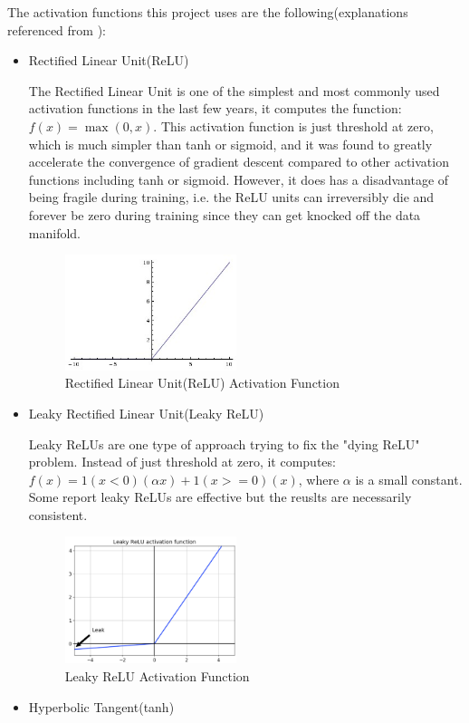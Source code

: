 The activation functions this project uses are the following(explanations referenced from \cite{cs231n}):
\begin{itemize}
    \item Rectified Linear Unit(ReLU)
    
    The Rectified Linear Unit is one of the simplest and most commonly used activation functions 
    in the last few years, it computes the function: $f(x)=\max(0,x)$. 
    This activation function is just threshold at zero, which is much simpler than tanh or sigmoid, 
    and it was found to greatly accelerate the convergence of gradient descent compared to other 
    activation functions including tanh or sigmoid. However, it does has a disadvantage of being fragile
    during training, i.e. the ReLU units can irreversibly die and forever be zero during training since 
    they can get knocked off the data manifold. 
    \begin{figure}[H]
        \begin{center}
        \includegraphics[width=5cm]{figures/relu}
        \end{center}
        \caption{Rectified Linear Unit(ReLU) Activation Function}
        \label{fig:ReLU}
    \end{figure}
    \item Leaky Rectified Linear Unit(Leaky ReLU)
    
    Leaky ReLUs are one type of approach trying to fix the "dying ReLU" problem. Instead of just threshold 
    at zero, it computes: $f(x)=1(x<0)(\alpha x)+1(x>=0)(x)$, where $\alpha$ is a small constant. Some report 
    leaky ReLUs are effective but the reuslts are necessarily consistent.
    \begin{figure}[H]
        \begin{center}
        \includegraphics[width=5cm]{figures/leakyrelu}
        \end{center}
        \caption{Leaky ReLU Activation Function}
        \label{fig:Leaky ReLU}
    \end{figure}
    \item Hyperbolic Tangent(tanh)
    

\end{itemize}
